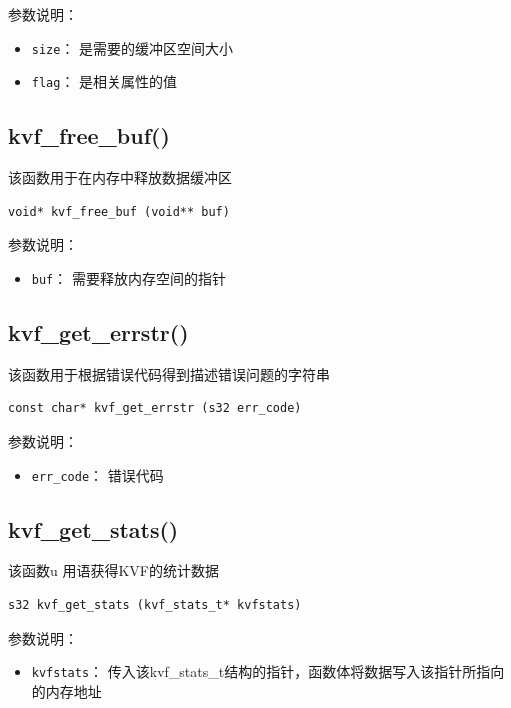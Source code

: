 		参数说明：
		\begin{itemize}
		\item \verb|size|：
			是需要的缓冲区空间大小
		\item \verb|flag|：
			是相关属性的值
		\end{itemize}
		
	\subsection{kvf\_free\_buf()}
		该函数用于在内存中释放数据缓冲区
		\begin{Verbatim}[frame = none]
    void* kvf_free_buf (void** buf)		
		\end{Verbatim}
		
		参数说明：
		\begin{itemize}
		\item \verb|buf|：
			需要释放内存空间的指针
		
		\end{itemize}
		
	\subsection{kvf\_get\_errstr()}
		该函数用于根据错误代码得到描述错误问题的字符串
		
		\begin{Verbatim}[frame = none]
    const char* kvf_get_errstr (s32 err_code)		
		\end{Verbatim}
		
		参数说明：
		\begin{itemize}
		\item \verb|err_code|：
			错误代码
		
		\end{itemize}

	\subsection{kvf\_get\_stats()}
		该函数u 用语获得KVF的统计数据

		\begin{Verbatim}[frame = none]
    s32 kvf_get_stats (kvf_stats_t* kvfstats)		
		\end{Verbatim}
		
		参数说明：
		\begin{itemize}
		\item \verb|kvfstats|：
			传入该kvf\_stats\_t结构的指针，函数体将数据写入该指针所指向的内存地址
		
		\end{itemize}

